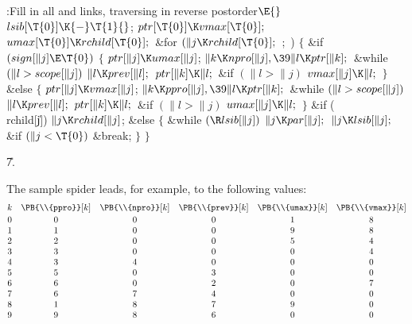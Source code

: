 \Y\B\4:Fill in all  and  links, traversing in
reverse postorder\X${}\E{}$\6
$\\{lsib}[\T{0}]\K{-}\T{1}{}$;\6
${}\\{ptr}[\T{0}]\K\\{vmax}[\T{0}];{}$\6
${}\\{umax}[\T{0}]\K\\{rchild}[\T{0}];{}$\6
\&{for} ${}(\|j\K\\{rchild}[\T{0}];{}$  ; \,)\5
${}\{{}$\1\6
\&{if} ${}(\\{sign}[\|j]\E\T{0}){}$\5
${}\{{}$\1\6
${}\\{ptr}[\|j]\K\\{umax}[\|j]{}$;\6
${}\|k\K\\{npro}[\|j],\39\|l\K\\{ptr}[\|k];{}$\6
\&{while} ${}(\|l>\\{scope}[\|j]){}$\1\5
${}\|l\K\\{prev}[\|l];{}$\2\6
${}\\{ptr}[\|k]\K\|l;{}$\6
\&{if} ${}(\|l>\|j){}$\1\5
${}\\{vmax}[\|j]\K\|l;{}$\2\6
\4${}\}{}$\5
\2\&{else}\5
${}\{{}$\1\6
${}\\{ptr}[\|j]\K\\{vmax}[\|j]{}$;\6
${}\|k\K\\{ppro}[\|j],\39\|l\K\\{ptr}[\|k];{}$\6
\&{while} ${}(\|l>\\{scope}[\|j]){}$\1\5
${}\|l\K\\{prev}[\|l];{}$\2\6
${}\\{ptr}[\|k]\K\|l;{}$\6
\&{if} ${}(\|l>\|j){}$\1\5
${}\\{umax}[\|j]\K\|l;{}$\2\6
\4${}\}{}$\2\6
\&{if} (\\{rchild}[\|j])\1\5
${}\|j\K\\{rchild}[\|j]{}$;\2\6
\&{else}\5
${}\{{}$\1\6
\&{while} ${}(\R\\{lsib}[\|j]){}$\1\5
${}\|j\K\\{par}[\|j];{}$\2\6
${}\|j\K\\{lsib}[\|j];{}$\6
\&{if} ${}(\|j<\T{0}){}$\1\5
\&{break};\2\6
\4${}\}{}$\2\6
\4${}\}{}$\2\par
\U7.\fi

The sample spider leads, for example, to the following
values:
$$\vbox{\halign{$\hfil#\hfil$\quad&
$\hfil#\hfil$\quad&
$\hfil#\hfil$\quad&
$\hfil#\hfil$\quad&
$\hfil#\hfil$\quad&
$\hfil#\hfil$\cr
k&\PB{\\{ppro}}[k]&\PB{\\{npro}}[k]&\PB{\\{prev}}[k]&\PB{\\{umax}}[k]&\PB{%
\\{vmax}}[k]\cr
\noalign{\vskip2pt}
0&0&0&0&1&8\cr
1&1&0&0&9&8\cr
2&2&0&0&5&4\cr
3&3&0&0&0&4\cr
4&3&4&0&0&0\cr
5&5&0&3&0&0\cr
6&6&0&2&0&7\cr
7&6&7&4&0&0\cr
8&1&8&7&9&0\cr
9&9&8&6&0&0\cr}}$$

